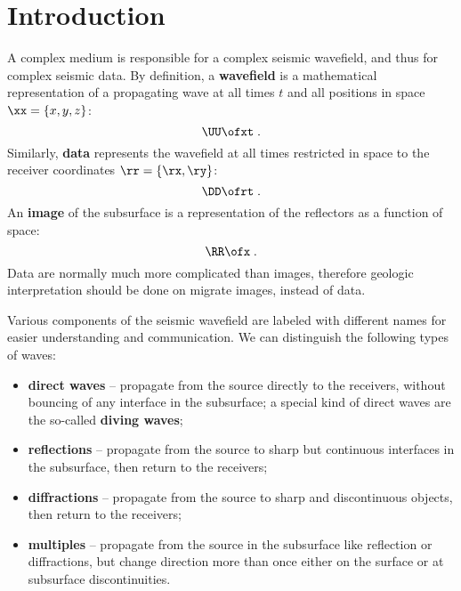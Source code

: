 \section{Introduction}

A complex medium is responsible for a complex seismic wavefield, and
thus for complex seismic data. By definition, a \textbf{wavefield} is
a mathematical representation of a propagating wave at all times $t$
and all positions in space $\xx=\{ x,y,z \}$:
%
\[ \UU\ofxt \;. \]
%
Similarly, \textbf{data} represents the wavefield at all times
restricted in space to the receiver coordinates $\rr=\{ \rx, \ry \}$:
%
\[ \DD\ofrt \;. \]
%
An \textbf{image} of the subsurface is a representation of the
reflectors as a function of space:
%
\[ \RR\ofx \;. \]
%
Data are normally much more complicated than images, therefore
geologic interpretation should be done on migrate images, instead of
data.

Various components of the seismic wavefield are labeled with different
names for easier understanding and communication. We can distinguish
the following types of waves:
\begin{itemize}
\item \textbf{direct waves} -- propagate from the source directly to
  the receivers, without bouncing of any interface in the subsurface;
  a special kind of direct waves are the so-called \textbf{diving
    waves};
\item \textbf{reflections} -- propagate from the source to sharp but
  continuous interfaces in the subsurface, then return to the
  receivers;
\item \textbf{diffractions} -- propagate from the source to sharp and
  discontinuous objects, then return to the receivers;
\item \textbf{multiples} -- propagate from the source in the
  subsurface like reflection or diffractions, but change direction
  more than once either on the surface or at subsurface
  discontinuities.
\end{itemize}

